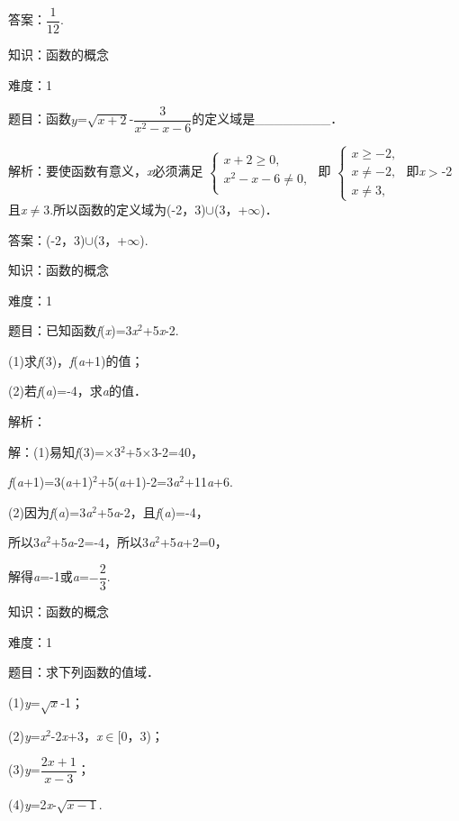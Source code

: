 \documentclass{article} %
\begin{document}
答案：$\dfrac{1}{12}$.

知识：函数的概念

难度：1

题目：函数$y$=$\sqrt{x+2}$-$\dfrac{3}{x^{2}-x-6}$的定义域是\_\_\_\_\_\_\_\_．

解析：要使函数有意义，\textit{x}必须满足
$\left\{
\begin{array}{l}
x+2\ge0,\\
x^{2}-x-6\neq0,\\
\end{array}
\right.$
即
$\left\{
\begin{array}{l}
x\ge-2,\\
x\neq-2,\\
x\neq 3,
\end{array}
\right.$
即\textit{x}$\mathrm{>}$-2且\textit{x}$\mathrm{\neq}$3.所以函数的定义域为(-2，3)$\mathrm{\cup}$(3，+$\mathrm{\infty}$)．

答案：(-2，3)$\mathrm{\cup}$(3，+$\mathrm{\infty}$).

知识：函数的概念

难度：1

题目：已知函数\textit{f}(\textit{x})=3\textit{x}${}^{2}$+5\textit{x}-2.

(1)求\textit{f}(3)，\textit{f}(\textit{a}+1)的值；

(2)若\textit{f}(\textit{a})=-4，求\textit{a}的值．

解析：

解：(1)易知\textit{f}(3)=$\mathrm{\times}$3${}^{2}$+5$\mathrm{\times}$3-2=40，

\textit{f}(\textit{a}+1)=3(\textit{a}+1)${}^{2}$+5(\textit{a}+1)-2=3\textit{a}${}^{2}$+11\textit{a}+6.

(2)因为\textit{f}(\textit{a})=3\textit{a}${}^{2}$+5\textit{a}-2，且\textit{f}(\textit{a})=-4，

所以3\textit{a}${}^{2}$+5\textit{a}-2=-4，所以3\textit{a}${}^{2}$+5\textit{a}+2=0，

解得\textit{a}=-1或\textit{a}=$-\dfrac{2}{3}$.

知识：函数的概念

难度：1

题目：求下列函数的值域．

(1)\textit{y}=$\sqrt{x}$-1；

(2)\textit{y}=\textit{x}${}^{2}$-2\textit{x}+3，\textit{x}$\mathrm{\in}$[0，3)；

(3)\textit{y}=$\dfrac{2x+1}{x-3}$；

(4)\textit{y}=2\textit{x}-$\sqrt{x-1}$.
\end{document}
